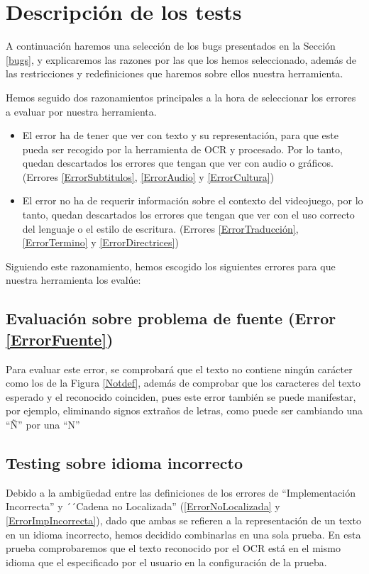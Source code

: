 \section{Descripción de los tests}
A continuación haremos una selección de los bugs presentados en la Sección \ref{bugs}, y explicaremos las razones por las que los hemos seleccionado, además de las restricciones y redefiniciones que haremos sobre ellos nuestra herramienta.

Hemos seguido dos razonamientos principales a la hora de seleccionar los errores a evaluar por nuestra herramienta.
\begin{itemize}
	\item El error ha de tener que ver con texto y su representación, para que este pueda ser recogido por la herramienta de OCR y procesado. Por lo tanto, quedan descartados los errores que tengan que ver con audio o gráficos. (Errores \ref{ErrorSubtitulos}, \ref{ErrorAudio} y \ref{ErrorCultura})
	\item El error no ha de requerir información sobre el contexto del videojuego, por lo tanto, quedan descartados los errores que tengan que ver con el uso correcto del lenguaje o el estilo de escritura. (Errores \ref{ErrorTraducción}, \ref{ErrorTermino} y \ref{ErrorDirectrices})
\end{itemize}

Siguiendo este razonamiento, hemos escogido los siguientes errores para que nuestra herramienta los evalúe:

\subsection{Evaluación sobre problema de fuente (Error \ref{ErrorFuente})}
Para evaluar este error, se comprobará que el texto no contiene ningún carácter como los de la Figura \ref{Notdef}, además de comprobar que los caracteres del texto esperado y el reconocido coinciden, pues este error también se puede manifestar, por ejemplo, eliminando signos extraños de letras, como puede ser cambiando una ``Ñ'' por una ``N''

\subsection{Testing sobre idioma incorrecto}
Debido a la ambigüedad entre las definiciones de los errores de ``Implementación Incorrecta'' y ´´Cadena no Localizada'' (\ref{ErrorNoLocalizada} y \ref{ErrorImpIncorrecta}), dado que ambas se refieren a la representación de un texto en un idioma incorrecto, hemos decidido combinarlas en una sola prueba. En esta prueba comprobaremos que el texto reconocido por el OCR está en el mismo idioma que el especificado por el usuario en la configuración de la prueba.


